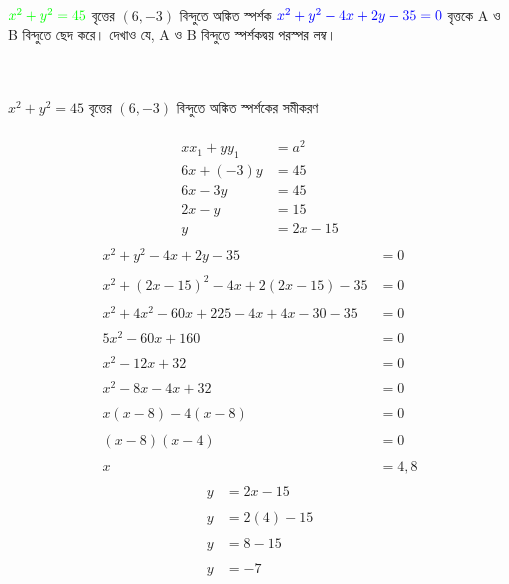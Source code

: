 \documentclass{article}
\begin{document}
\\
$\textcolor{green}{x^2+y^2=45}$ বৃত্তের  $(6,-3)$ বিন্দুতে অঙ্কিত স্পর্শক  $\textcolor{blue}{x^2+y^2-4x+2y-35=0}$ বৃত্তকে  A ও  B বিন্দুতে ছেদ করে। দেখাও যে,  A ও B বিন্দুতে স্পর্শকদ্বয় পরস্পর লম্ব। \\
\\  
\\

$x^2+y^2=45$ বৃত্তের  $(6,-3)$ বিন্দুতে অঙ্কিত স্পর্শকের সমীকরণ\\ 
\\ 
\begin{align*}
xx_1+yy_1&=a^2\\
6x+(-3)y&=45\\
6x-3y&=45\\
2x-y&=15\\
y&=2x-15\\
\end{align*}
\begin{align*}
x^2+y^2-4x+2y-35&=0\\
\\
x^2+(2x-15)^2-4x+2(2x-15)-35&=0\\
\\
x^2+4x^2-60x+225-4x+4x-30-35&=0\\
\\
5x^2-60x+160&=0\\
\\
x^2-12x+32&=0\\
\\
x^2-8x-4x+32&=0\\
\\
x(x-8)-4(x-8)&=0\\
\\
(x-8)(x-4)&=0\\
\\
x&=4,8\\
\end{align*}
\begin{align*}
y&=2x-15\\
\\
y&=2(4)-15\\
\\
y&=8-15\\
\\
y&=-7\\
\end{align*}
\end{document}
